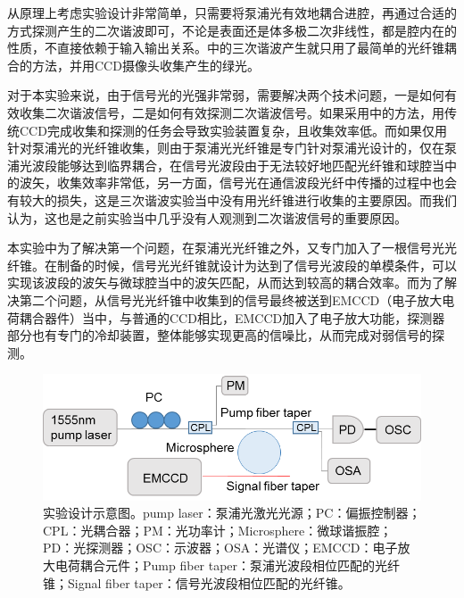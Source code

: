 \documentclass[UTF8,a4paper,cs4size,hyperref]{ctexart}
\begin{document}
从原理上考虑实验设计非常简单，只需要将泵浦光有效地耦合进腔，再通过合适的方式探测产生的二次谐波即可，不论是表面还是体多极二次非线性，都是腔内在的性质，不直接依赖于输入输出关系。\cite{carmon2007visible}中的三次谐波产生就只用了最简单的光纤锥耦合的方法，并用CCD摄像头收集产生的绿光。

对于本实验来说，由于信号光的光强非常弱，需要解决两个技术问题，一是如何有效收集二次谐波信号，二是如何有效探测二次谐波信号。如果采用\cite{carmon2007visible}中的方法，用传统CCD完成收集和探测的任务会导致实验装置复杂，且收集效率低。而如果仅用针对泵浦光的光纤锥收集，则由于泵浦光光纤锥是专门针对泵浦光设计的，仅在泵浦光波段能够达到临界耦合，在信号光波段由于无法较好地匹配光纤锥和球腔当中的波矢，收集效率非常低，另一方面，信号光在通信波段光纤中传播的过程中也会有较大的损失，这是三次谐波实验当中没有用光纤锥进行收集的主要原因。而我们认为，这也是之前实验当中几乎没有人观测到二次谐波信号的重要原因。

本实验中为了解决第一个问题，在泵浦光光纤锥之外，又专门加入了一根信号光光纤锥。在制备的时候，信号光光纤锥就设计为达到了信号光波段的单模条件，可以实现该波段的波矢与微球腔当中的波矢匹配，从而达到较高的耦合效率。而为了解决第二个问题，从信号光光纤锥中收集到的信号最终被送到EMCCD（电子放大电荷耦合器件）当中，与普通的CCD相比，EMCCD加入了电子放大功能，探测器部分也有专门的冷却装置，整体能够实现更高的信噪比，从而完成对弱信号的探测。


\begin{figure}
\centering
\includegraphics[width=16cm ]{ExpSetup.png}
\caption{实验设计示意图。pump laser：泵浦光激光光源；PC：偏振控制器；CPL：光耦合器；PM：光功率计；Microsphere：微球谐振腔；PD：光探测器；OSC：示波器；OSA：光谱仪；EMCCD：电子放大电荷耦合元件；Pump fiber taper：泵浦光波段相位匹配的光纤锥；Signal fiber taper：信号光波段相位匹配的光纤锥。}
\label{pic:ExpSetup}
\end{figure}
\end{document}
